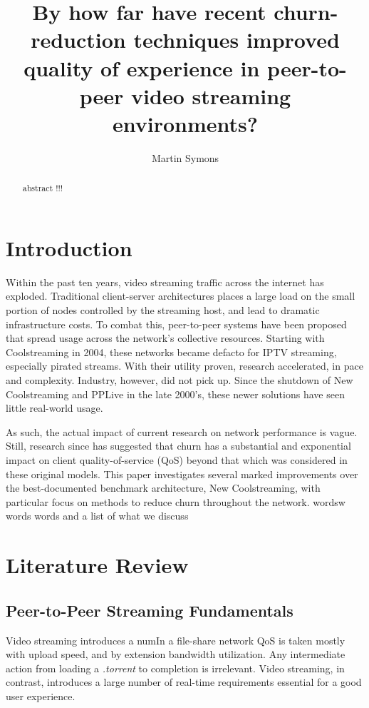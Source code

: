 \documentclass[12pt,a4paper]{article}
\title{By how far have recent churn-reduction techniques improved quality of experience in peer-to-peer video streaming environments?}
\author{Martin Symons}
\begin{document}
\maketitle

\begin{abstract}
abstract !!! 
\end{abstract}

\section{Introduction} \label{introduction}
Within the past ten years, video streaming traffic across the internet has exploded. Traditional client-server architectures places a large load on the small portion of nodes controlled by the streaming host, and lead to dramatic infrastructure costs. To combat this, peer-to-peer systems have been proposed that spread usage across the network's collective resources. Starting with Coolstreaming in 2004, these networks became defacto for IPTV streaming, especially pirated streams. With their utility proven, research accelerated, in pace and complexity. Industry, however, did not pick up. Since the shutdown of New Coolstreaming and PPLive in the late 2000's, these newer solutions have seen little real-world usage.

As such, the actual impact of current research on network performance is vague. Still, research since has suggested that churn has a substantial and exponential impact on client quality-of-service (QoS) beyond that which was considered in these original models. This paper investigates several marked improvements over the best-documented benchmark architecture, New Coolstreaming, with particular focus on methods to reduce churn throughout the network. wordsw words words and a list of what we discuss

\section{Literature Review}  \label{litreview}
\subsection{Peer-to-Peer Streaming Fundamentals} \label{litreview:fundamentals}
Video streaming introduces a numIn a file-share network QoS is taken mostly with upload speed, and by extension bandwidth utilization. Any intermediate action from loading a \textit{.torrent} to completion is irrelevant. Video streaming, in contrast, introduces a large number of real-time requirements essential for a good user experience.
\end{document}

